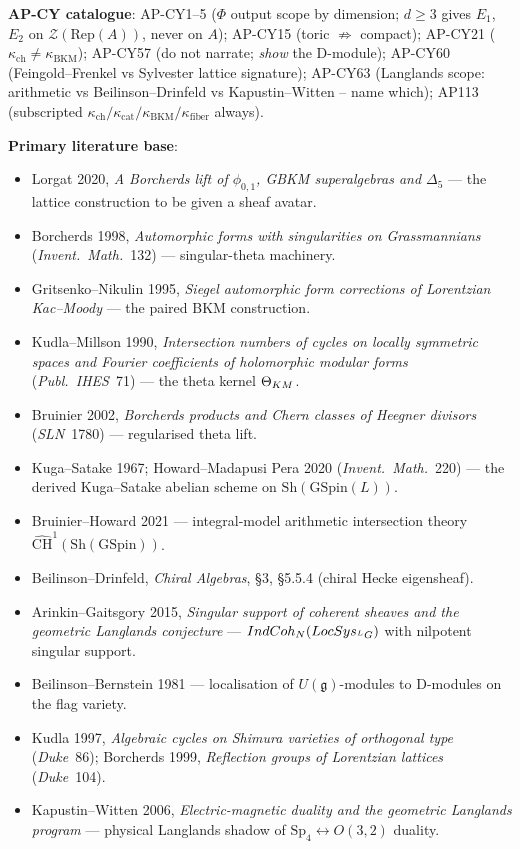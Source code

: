 \documentclass[11pt]{amsart}
\theoremstyle{definition}
\providecommand{\kch}{\kappa_{\mathrm{ch}}}
\providecommand{\kBKM}{\kappa_{\mathrm{BKM}}}
\providecommand{\IndCoh}{\mathrm{IndCoh}}
\providecommand{\Sh}{\mathrm{Sh}}
\providecommand{\LocSys}{\mathrm{LocSys}}
\providecommand{\Rep}{\mathrm{Rep}}
\providecommand{\GSpin}{\mathrm{GSpin}}
\providecommand{\Sp}{\mathrm{Sp}}
\providecommand{\LG}{{}^L G}
\providecommand{\cZ}{\mathcal{Z}}
\providecommand{\cCH}{\widehat{\mathrm{CH}}}
\providecommand{\Dfive}{\Delta_5}
\begin{document}
\noindent\textbf{AP-CY catalogue}:
AP-CY1--5 ($\Phi$ output scope by dimension; $d \geq 3$ gives $E_1$,
$E_2$ on $\cZ(\Rep(A))$, never on $A$);
AP-CY15 (toric $\not\Rightarrow$ compact);
AP-CY21 ($\kch \neq \kBKM$);
AP-CY57 (do not narrate; \emph{show} the D-module);
AP-CY60 (Feingold--Frenkel vs Sylvester lattice signature);
AP-CY63 (Langlands scope: arithmetic vs Beilinson--Drinfeld vs
Kapustin--Witten -- name which);
AP113 (subscripted $\kappa_{\mathrm{ch}}/\kappa_{\mathrm{cat}}/\kappa_{\mathrm{BKM}}/\kappa_{\mathrm{fiber}}$ always).

\noindent\textbf{Primary literature base}:
\begin{itemize}\itemsep 2pt
 \item Lorgat 2020, \emph{A Borcherds lift of $\phi_{0,1}$, GBKM
   superalgebras and $\Dfive$} --- the lattice construction to be
   given a sheaf avatar.
 \item Borcherds 1998, \emph{Automorphic forms with singularities on
   Grassmannians} (\emph{Invent.\ Math.}~132) --- singular-theta
   machinery.
 \item Gritsenko--Nikulin 1995, \emph{Siegel automorphic form
   corrections of Lorentzian Kac--Moody} --- the paired BKM
   construction.
 \item Kudla--Millson 1990, \emph{Intersection numbers of cycles on
   locally symmetric spaces and Fourier coefficients of holomorphic
   modular forms} (\emph{Publ.\ IHES}~71) --- the theta kernel
   $\Theta_{\rm KM}$.
 \item Bruinier 2002, \emph{Borcherds products and Chern classes of
   Heegner divisors} (\emph{SLN}~1780) --- regularised theta lift.
 \item Kuga--Satake 1967; Howard--Madapusi Pera 2020 (\emph{Invent.\
   Math.}~220) --- the derived Kuga--Satake abelian scheme on
   $\Sh(\GSpin(L))$.
 \item Bruinier--Howard 2021 --- integral-model arithmetic
   intersection theory $\cCH^1(\Sh(\GSpin))$.
 \item Beilinson--Drinfeld, \emph{Chiral Algebras}, \S3, \S5.5.4
   (chiral Hecke eigensheaf).
 \item Arinkin--Gaitsgory 2015, \emph{Singular support of coherent
   sheaves and the geometric Langlands conjecture} ---
   $\IndCoh_{\cN}(\LocSys_{\LG})$ with nilpotent singular support.
 \item Beilinson--Bernstein 1981 --- localisation of
   $U(\mathfrak{g})$-modules to D-modules on the flag variety.
 \item Kudla 1997, \emph{Algebraic cycles on Shimura varieties of
   orthogonal type} (\emph{Duke}~86); Borcherds 1999,
   \emph{Reflection groups of Lorentzian lattices} (\emph{Duke}~104).
 \item Kapustin--Witten 2006, \emph{Electric-magnetic duality and the
   geometric Langlands program} --- physical Langlands shadow of
   $\Sp_4 \leftrightarrow O(3,2)$ duality.
\end{itemize}
\end{document}
